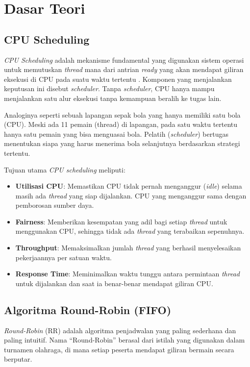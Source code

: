 \newpage
\section{Dasar Teori}

\subsection{CPU Scheduling}
\textit{CPU Scheduling} adalah mekanisme fundamental yang digunakan sistem operasi untuk memutuskan \textit{thread} mana dari antrian \textit{ready} yang akan mendapat giliran eksekusi di CPU pada suatu waktu tertentu \cite{Silberschatz2018}. Komponen yang menjalankan keputusan ini disebut \textit{scheduler}. Tanpa \textit{scheduler}, CPU hanya mampu menjalankan satu alur eksekusi tanpa kemampuan beralih ke tugas lain.

Analoginya seperti sebuah lapangan sepak bola yang hanya memiliki satu bola (CPU). Meski ada 11 pemain (thread) di lapangan, pada satu waktu tertentu hanya satu pemain yang bisa menguasai bola. Pelatih (\textit{scheduler}) bertugas menentukan siapa yang harus menerima bola selanjutnya berdasarkan strategi tertentu.

Tujuan utama \textit{CPU scheduling} meliputi:
\begin{itemize}
	\item \textbf{Utilisasi CPU}: Memastikan CPU tidak pernah menganggur (\textit{idle}) selama masih ada \textit{thread} yang siap dijalankan. CPU yang menganggur sama dengan pemborosan sumber daya.
	\item \textbf{Fairness}: Memberikan kesempatan yang adil bagi setiap \textit{thread} untuk menggunakan CPU, sehingga tidak ada \textit{thread} yang terabaikan sepenuhnya.
	\item \textbf{Throughput}: Memaksimalkan jumlah \textit{thread} yang berhasil menyelesaikan pekerjaannya per satuan waktu.
	\item \textbf{Response Time}: Meminimalkan waktu tunggu antara permintaan \textit{thread} untuk dijalankan dan saat ia benar-benar mendapat giliran CPU.
\end{itemize}

\subsection{Algoritma Round-Robin (FIFO)}
\textit{Round-Robin} (RR) adalah algoritma penjadwalan yang paling sederhana dan paling intuitif. Nama ``Round-Robin'' berasal dari istilah yang digunakan dalam turnamen olahraga, di mana setiap peserta mendapat giliran bermain secara berputar.

